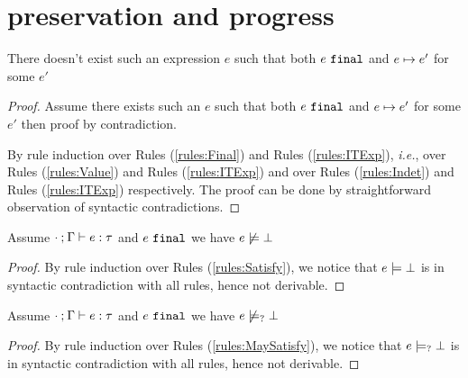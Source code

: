 \section{preservation and progress}

\begin{lem}[Finality]
  \label{lem:finality}
  There doesn't exist such an expression $e$ such that both $e ~\mathtt{final}$ and $e \mapsto e'$ for some $e'$
\end{lem}
\begin{proof}Assume there exists such an $e$ such that both $e ~\mathtt{final}$ and $e \mapsto e'$ for some $e'$ then proof by contradiction.
 
  By rule induction over Rules (\ref{rules:Final}) and Rules (\ref{rules:ITExp}), \textit{i.e.}, over Rules (\ref{rules:Value}) and Rules (\ref{rules:ITExp}) and over Rules (\ref{rules:Indet}) and Rules (\ref{rules:ITExp}) respectively. The proof can be done by straightforward observation of syntactic contradictions.
\end{proof}

\begin{lem}
  \label{lem:no-e-satisfy-falsity}
  Assume $\cdot \mathbin{;} \Gamma \vdash e : \tau$ and $e ~\mathtt{final}$ we have $e \not\models \bot$
\end{lem}
\begin{proof}
  By rule induction over Rules (\ref{rules:Satisfy}), we notice that $e \models \bot$ is in syntactic contradiction with all rules, hence not derivable.
\end{proof}

\begin{lem}
  \label{lem:no-e-may-satisfy-falsity}
  Assume $\cdot \mathbin{;} \Gamma \vdash e : \tau$ and $e ~\mathtt{final}$ we have $e \not\models_{?} \bot$
\end{lem}
\begin{proof}
  By rule induction over Rules (\ref{rules:MaySatisfy}), we notice that $e \models_{?} \bot$ is in syntactic contradiction with all rules, hence not derivable.
\end{proof}

